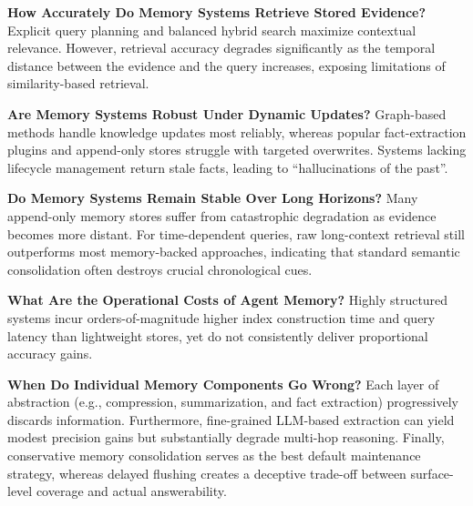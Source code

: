 \documentclass{llmxive}
\providecommand{\llm}{\textsc{LLM}\xspace}
\begin{document}
\noindent
 \textbf{How Accurately Do Memory Systems Retrieve Stored Evidence?} Explicit query planning and balanced hybrid search maximize contextual relevance. However, retrieval accuracy degrades significantly as the temporal distance between the evidence and the query increases, exposing limitations of similarity-based retrieval.

\noindent
 \textbf{Are Memory Systems Robust Under Dynamic Updates?} Graph-based methods handle knowledge updates most reliably, whereas popular fact-extraction plugins and append-only stores struggle with targeted overwrites. Systems lacking lifecycle management return stale facts, leading to ``hallucinations of the past''.

\noindent
 \textbf{Do Memory Systems Remain Stable Over Long Horizons?} Many append-only memory stores suffer from catastrophic degradation as evidence becomes more distant. For time-dependent queries, raw long-context retrieval still outperforms most memory-backed approaches, indicating that standard semantic consolidation often destroys crucial chronological cues.

\noindent
 \textbf{What Are the Operational Costs of Agent Memory?} Highly structured systems incur orders-of-magnitude higher index construction time and query latency than lightweight stores, yet do not consistently deliver proportional accuracy gains.

\noindent
 \textbf{When Do Individual Memory Components Go Wrong?} Each layer of abstraction (e.g., compression, summarization, and fact extraction) progressively discards information. Furthermore, fine-grained \llm-based extraction can yield modest precision gains but substantially degrade multi-hop reasoning. Finally, conservative memory consolidation serves as the best default maintenance strategy, whereas delayed flushing creates a deceptive trade-off between surface-level coverage and actual answerability.

\end{document}
